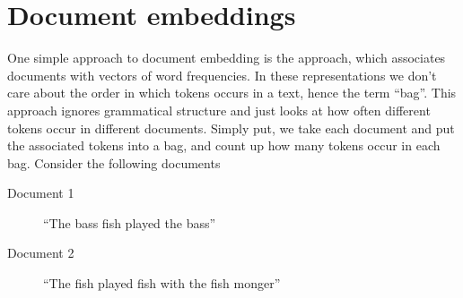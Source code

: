 
%
%
%
%

\section{Document embeddings}

One simple approach to document embedding is the  approach, which associates documents with vectors of word frequencies. In these representations we don't care about the order in which tokens occurs in a text, hence the term ``bag''. This approach ignores grammatical structure and just looks at how often different tokens occur in different documents.  Simply put, we take each document and put the associated tokens into a bag, and count up how many tokens occur in each bag. Consider the following documents

\begin{description}
\item[Document 1]  ``The bass fish played the bass''
\item[Document 2]  ``The fish played fish with the fish monger''
\end{description}

